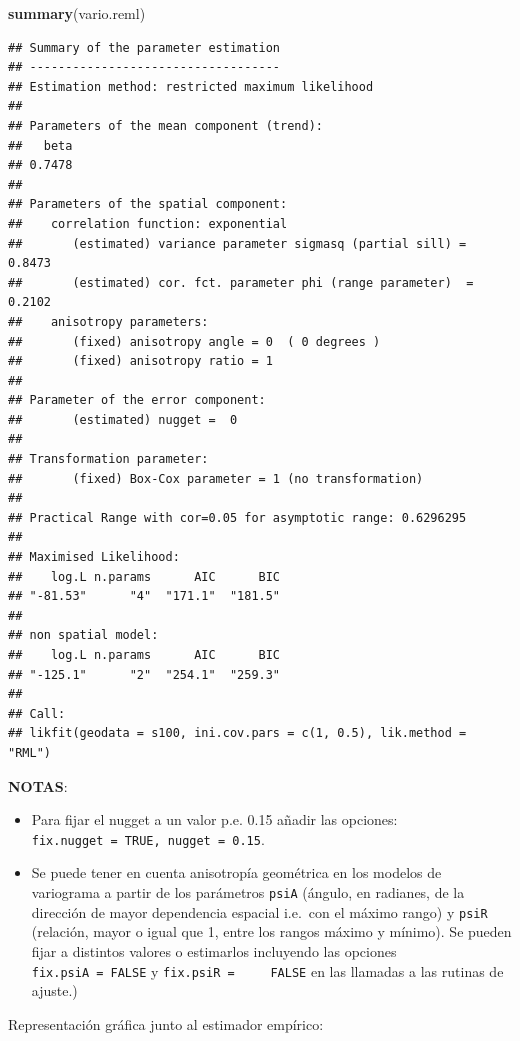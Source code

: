 \documentclass[
]{book}
\newenvironment{Shaded}{\begin{snugshade}}{\end{snugshade}}
\newcommand{\FunctionTok}[1]{\textcolor[rgb]{0.13,0.29,0.53}{\textbf{#1}}}
\newcommand{\NormalTok}[1]{#1}
\theoremstyle{break}
\theoremstyle{definition}
\theoremstyle{definition}
\theoremstyle{definition}
\theoremstyle{definition}
\theoremstyle{remark}
\begin{document}
\begin{Shaded}
\begin{Highlighting}[]
\FunctionTok{summary}\NormalTok{(vario.reml)}
\end{Highlighting}
\end{Shaded}

\begin{verbatim}
## Summary of the parameter estimation
## -----------------------------------
## Estimation method: restricted maximum likelihood 
## 
## Parameters of the mean component (trend):
##   beta 
## 0.7478 
## 
## Parameters of the spatial component:
##    correlation function: exponential
##       (estimated) variance parameter sigmasq (partial sill) =  0.8473
##       (estimated) cor. fct. parameter phi (range parameter)  =  0.2102
##    anisotropy parameters:
##       (fixed) anisotropy angle = 0  ( 0 degrees )
##       (fixed) anisotropy ratio = 1
## 
## Parameter of the error component:
##       (estimated) nugget =  0
## 
## Transformation parameter:
##       (fixed) Box-Cox parameter = 1 (no transformation)
## 
## Practical Range with cor=0.05 for asymptotic range: 0.6296295
## 
## Maximised Likelihood:
##    log.L n.params      AIC      BIC 
## "-81.53"      "4"  "171.1"  "181.5" 
## 
## non spatial model:
##    log.L n.params      AIC      BIC 
## "-125.1"      "2"  "254.1"  "259.3" 
## 
## Call:
## likfit(geodata = s100, ini.cov.pars = c(1, 0.5), lik.method = "RML")
\end{verbatim}

\textbf{NOTAS}:

\begin{itemize}
\item
  Para fijar el nugget a un valor p.e. 0.15 añadir las opciones:
  \texttt{fix.nugget\ =\ TRUE,\ nugget\ =\ 0.15}.
\item
  Se puede tener en cuenta anisotropía geométrica en los modelos de
  variograma a partir de los parámetros \texttt{psiA} (ángulo, en radianes,
  de la dirección de mayor dependencia espacial i.e.~con el
  máximo rango) y \texttt{psiR} (relación, mayor o igual que 1, entre los
  rangos máximo y mínimo). Se pueden fijar a distintos valores o
  estimarlos incluyendo las opciones \texttt{fix.psiA\ =\ FALSE} y \texttt{fix.psiR\ =\ \ \ \ \ FALSE} en las llamadas a las rutinas de ajuste.)
\end{itemize}

Representación gráfica junto al estimador empírico:
\end{document}

